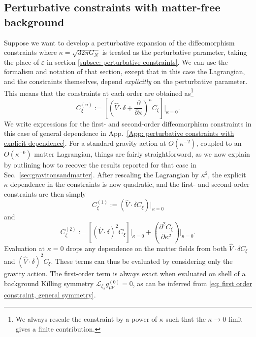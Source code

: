 \documentclass[]{jkpaper}
\theoremstyle{plain}
\theoremstyle{definition}
\newcommand{\fins}{\cdot}
\newcommand{\fd}{\delta}
\newcommand{\sL}{\mathcal{L}}
\begin{document}
\subsection{Perturbative constraints with matter-free background}

Suppose we want to develop a perturbative expansion of the diffeomorphism constraints where $\kappa=\sqrt{32\pi G_N}$ is treated as the perturbative parameter, taking the place of $\varepsilon$ in section \ref{subsec: perturbative constraints}.  We can use the formalism and notation of that section, except that in this case the Lagrangian, and the constraints themselves, depend \textit{explicitly} on the perturbative parameter. This means that the constraints at each order are obtained as\footnote{We always rescale the constraint by a power of $\kappa$ such that the $\kappa\rightarrow 0$ limit gives a finite contribution.}
\begin{equation}
    C^{(n)}_{\xi}:=\left[\left(\hat{V}\fins\fd + \frac{\partial}{\partial\kappa}\right)^n C_\xi\right]\big|_{\kappa=0}.
\end{equation}
We write expressions for the first- and second-order diffeomorphism constraints in this case of general dependence in App.~\ref{App: perturbative constraints with explicit dependence}.  For a standard gravity action at $O(\kappa^{-2})$, coupled to an $O(\kappa^{-0})$ matter Lagrangian, things are fairly straightforward, as we now explain by outlining how to recover the results reported for that case in Sec.~\ref{sec:gravitonsandmatter}.  After rescaling the Lagrangian by $\kappa^2$, the explicit $\kappa$ dependence in the constraints is now quadratic, and the first- and second-order constraints are then simply
\begin{equation}
    C^{(1)}_{\xi}:=\left(\hat{V}\fins\fd C_\xi\right)\big|_{\kappa=0}
\end{equation}
and 
\begin{equation}
    C^{(2)}_{\xi}:=
    \left[(\hat{V}\fins\fd)^2 C_\xi\right]\big|_{\kappa=0}+\left(\frac{\partial^2 C_\xi}{\partial\kappa^2}\right)\big|_{\kappa=0}.
\end{equation}
Evaluation at $\kappa=0$ drops any dependence on the matter fields from both $\hat{V}\fins\fd C_\xi$ and $(\hat{V}\fins\fd)^2 C_\xi$.  These terms can thus be evaluated by considering only the gravity action.  The first-order term is always exact when evaluated on shell of a background Killing symmetry $\sL_{\xi_s} g^{(0)}_{\mu\nu}=0$, as can be inferred from 
\eqref{eq: first order constraint, general symmetry}.
\end{document}
